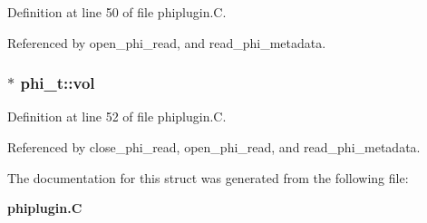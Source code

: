 Definition at line 50 of file phiplugin.C.

Referenced by open\_\-phi\_\-read, and read\_\-phi\_\-metadata.
\subsubsection{$\ast$ phi\_\-t::vol}\label{structphi__t_m3}




Definition at line 52 of file phiplugin.C.

Referenced by close\_\-phi\_\-read, open\_\-phi\_\-read, and read\_\-phi\_\-metadata.

The documentation for this struct was generated from the following file:\begin{CompactItemize}
\item 
{\bf phiplugin.C}\end{CompactItemize}

